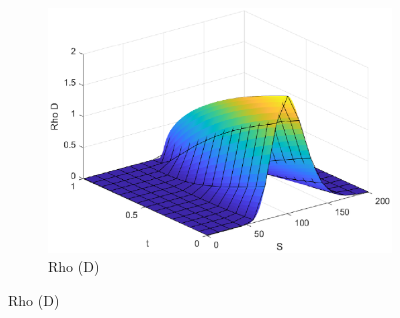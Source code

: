 \begin{figure}[H]
\begin{subfigure}[b]{0.35\linewidth}
        \includegraphics[width=\linewidth]{Imagenes/6_Sols/Binary_Call/Binary_Call_Rho_D.eps}
        \caption{Rho (D)}
    \end{subfigure}
\end{figure}


